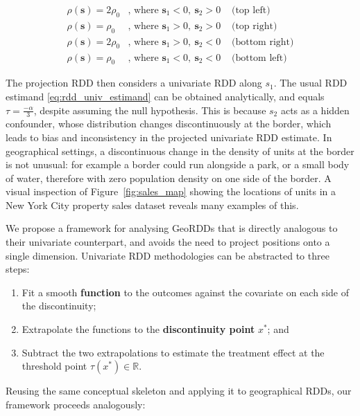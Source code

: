 \documentclass[letter]{article}
\providecommand{\tightlist}{%
      \setlength{\itemsep}{0pt}\setlength{\parskip}{0pt}}
\newcommand{\svec}{\mathbold{s}}
\providecommand{\tightlist}{%
  	  \setlength{\itemsep}{0pt}\setlength{\parskip}{0pt}}
\begin{document}
\begin{equation}
\begin{aligned}
    \rho(\svec) = 2\rho_0 & \text{, where }\svec_1 < 0,~\svec_2 > 0 & \text{ (top left)} \\
    \rho(\svec) = \rho_0 & \text{, where }\svec_1 > 0,~\svec_2 > 0 & \text{ (top right)} \\
    \rho(\svec) = 2\rho_0 & \text{, where }\svec_1 > 0,~\svec_2 < 0 & \text{ (bottom right)}  \\
    \rho(\svec) = \rho_0 & \text{, where }\svec_1 < 0,~\svec_2 < 0 & \text{ (bottom left)}
\end{aligned}
\end{equation}

The projection RDD then considers a univariate RDD along \(s_1\).
The usual RDD estimand \eqref{eq:rdd_univ_estimand} can be obtained analytically, and equals \(\tau=\frac{-\alpha}{3}\), despite assuming the null hypothesis.
This is because \(s_2\) acts as a hidden confounder, whose distribution changes discontinuously at the border, which leads to bias and inconsistency in the projected univariate RDD estimate.
In geographical settings, a discontinuous change in the density of units at the border is not unusual: for example a border could run alongside a park, or a small body of water, therefore with zero population density on one side of the border.
A visual inspection of Figure~\ref{fig:sales_map} showing the locations of units in a New York City property sales dataset reveals many examples of this.
    


    	We propose a framework for analysing GeoRDDs that is directly analogous to their univariate counterpart, and avoids the need to project positions onto a single dimension.
Univariate RDD methodologies can be abstracted to three steps:

\begin{enumerate}
\def\labelenumi{\arabic{enumi}.}
\tightlist
\item
  Fit a smooth \textbf{function} to the outcomes against the covariate on each side of the discontinuity;
\item
  Extrapolate the functions to the \textbf{discontinuity point} \(x^*\); and
\item
  Subtract the two extrapolations to estimate the treatment effect at the threshold point \(\tau(x^*) \in \mathbb{R}\).
\end{enumerate}

Reusing the same conceptual skeleton and applying it to geographical RDDs, our framework proceeds analogously:
\end{document}
